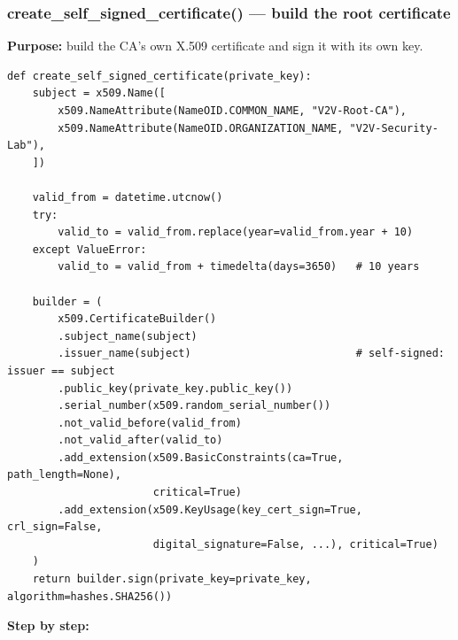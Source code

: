 \documentclass[11pt,a4paper]{article}
\begin{document}
\subsubsection*{create\_self\_signed\_certificate() --- build the root certificate}
\textbf{Purpose:} build the CA's own X.509 certificate and sign it with its own key.
\begin{lstlisting}[style=py,caption={ca/ca.py --- build and self-sign the root
certificate (KeyUsage flags abbreviated with ``...'' for space; in the real
file every flag is written out).}]
def create_self_signed_certificate(private_key):
    subject = x509.Name([
        x509.NameAttribute(NameOID.COMMON_NAME, "V2V-Root-CA"),
        x509.NameAttribute(NameOID.ORGANIZATION_NAME, "V2V-Security-Lab"),
    ])

    valid_from = datetime.utcnow()
    try:
        valid_to = valid_from.replace(year=valid_from.year + 10)
    except ValueError:
        valid_to = valid_from + timedelta(days=3650)   # 10 years

    builder = (
        x509.CertificateBuilder()
        .subject_name(subject)
        .issuer_name(subject)                          # self-signed: issuer == subject
        .public_key(private_key.public_key())
        .serial_number(x509.random_serial_number())
        .not_valid_before(valid_from)
        .not_valid_after(valid_to)
        .add_extension(x509.BasicConstraints(ca=True, path_length=None),
                       critical=True)
        .add_extension(x509.KeyUsage(key_cert_sign=True, crl_sign=False,
                       digital_signature=False, ...), critical=True)
    )
    return builder.sign(private_key=private_key, algorithm=hashes.SHA256())
\end{lstlisting}
\textbf{Step by step:}
\end{document}
